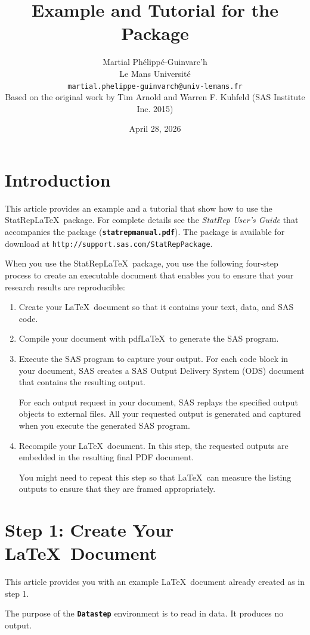 \documentclass{article}
\title{Example and Tutorial for the \Statrep Package}
\author{Martial Phélippé-Guinvarc'h\\Le Mans Université\\\texttt{martial.phelippe-guinvarch@univ-lemans.fr}\\
\smallskip
{\small Based on the original work by Tim Arnold and Warren F. Kuhfeld (SAS Institute Inc. 2015)}}
\date{April 28, 2026}
\newcommand*{\Statrep}{\mbox{\textsf{StatRep}}\xspace}
\newcommand*{\Code}[1]{\texttt{\textbf{#1}}}
\begin{document}
\maketitle
\section{Introduction}
This article provides an example and a
tutorial that show how to use the \Statrep \LaTeX\ package.
For complete details
see the \emph{\Statrep User's Guide} that accompanies the
package (\Code{statrepmanual.pdf}). The package is available
for download at \texttt{http://support.sas.com/StatRepPackage}.

When you use the \Statrep \LaTeX\ package, you use the following
four-step process to create an executable document that
enables you to ensure that your research results are reproducible:
\begin{enumerate}
\item Create your \LaTeX\ document so that it contains your text,
data, and SAS code.

\item Compile your document with pdf\LaTeX\ to generate the SAS
program.

\item Execute the SAS program to capture your output. For each
code block in your document, SAS creates a SAS Output Delivery System (ODS)
document that contains the resulting output.

For each output request in your document, SAS replays the
specified output objects to external files. All your
requested output is generated and captured when you execute
the generated SAS program.

\item Recompile your \LaTeX\ document. In this step, the
requested outputs are embedded in the resulting final PDF document.

You might need to repeat this step so that \LaTeX\ can measure the
listing outputs to ensure that they are framed appropriately.
\end{enumerate}

\section{Step 1: Create Your \LaTeX\ Document}
This article provides you with an example \LaTeX\ document
already created as in step 1.

The purpose of the \Code{Datastep} environment is to read in data.
It produces no output.
\end{document}
